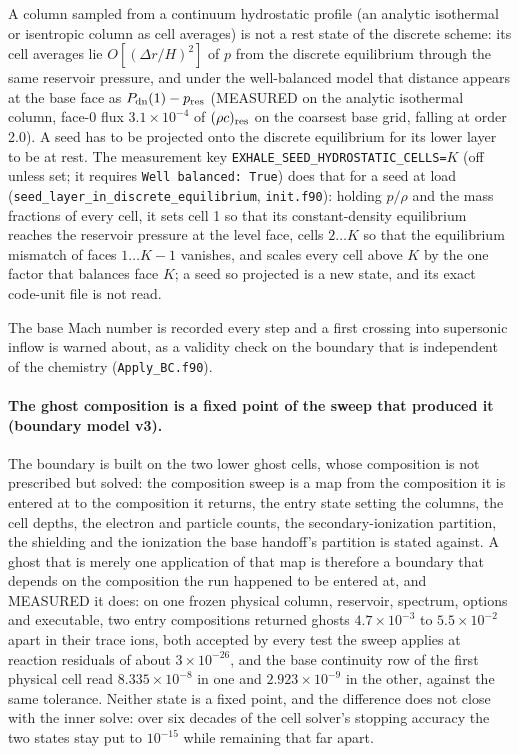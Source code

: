 A column sampled from a continuum hydrostatic profile (an analytic isothermal
or isentropic column as cell averages) is not a rest state of the discrete
scheme: its cell averages lie $O[(\Delta r/H)^2]$ of $p$ from the discrete
equilibrium through the same reservoir pressure, and under the well-balanced
model that distance appears at the base face as $P_{\rm dn}(1) - p_{\rm res}$
(MEASURED on the analytic isothermal column, face-0 flux $3.1\times10^{-4}$ of
$(\rho c)_{\rm res}$ on the coarsest base grid, falling at order 2.0).  A seed
has to be projected onto the discrete equilibrium for its lower layer to be
at rest.  The measurement key \texttt{EXHALE\_SEED\_HYDROSTATIC\_CELLS=}$K$
(off unless set; it requires \texttt{Well balanced: True}) does that for a
seed at load (\texttt{seed\_layer\_in\_discrete\_equilibrium},
\texttt{init.f90}): holding $p/\rho$ and the mass fractions of every cell, it
sets cell 1 so that its constant-density equilibrium reaches the reservoir
pressure at the level face, cells $2\ldots K$ so that the equilibrium
mismatch of faces $1\ldots K-1$ vanishes, and scales every cell above $K$ by
the one factor that balances face $K$; a seed so projected is a new state,
and its exact code-unit file is not read.

The base Mach number is recorded every step and a first crossing into
supersonic inflow is warned about, as a validity check on the boundary that is
independent of the chemistry (\texttt{Apply\_BC.f90}).

\paragraph{The ghost composition is a fixed point of the sweep that produced
it (boundary model v3).}
The boundary is built on the two lower ghost cells, whose composition is not
prescribed but solved: the composition sweep is a map from the composition it
is entered at to the composition it returns, the entry state setting the
columns, the cell depths, the electron and particle counts, the
secondary-ionization partition, the shielding and the ionization the base
handoff's partition is stated against.  A ghost that is merely one
application of that map is therefore a boundary that depends on the
composition the run happened to be entered at, and MEASURED it does: on one
frozen physical column, reservoir, spectrum, options and executable, two
entry compositions returned ghosts $4.7\times10^{-3}$ to $5.5\times10^{-2}$
apart in their trace ions, both accepted by every test the sweep applies at
reaction residuals of about $3\times10^{-26}$, and the base continuity row of
the first physical cell read $8.335\times10^{-8}$ in one and
$2.923\times10^{-9}$ in the other, against the same tolerance.  Neither state
is a fixed point, and the difference does not close with the inner solve: over
six decades of the cell solver's stopping accuracy the two states stay put to
$10^{-15}$ while remaining that far apart.

